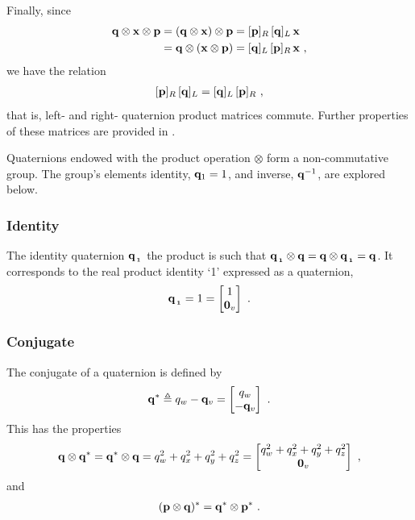 Finally, since
%
\begin{align*}
{\bf q}\otimes{\bf x}\otimes{\bf p} 
&= ({\bf q}\otimes{\bf x})\otimes{\bf p} = [{\bf p}]_R\,[{\bf q}]_L\,{\bf x} 
\\
&= {\bf q}\otimes({\bf x}\otimes{\bf p}) = [{\bf q}]_L\,[{\bf p}]_R\,{\bf x}
~,
\end{align*}
%
we have the relation
%
\begin{align}
[{\bf p}]_R\,[{\bf q}]_L = [{\bf q}]_L\,[{\bf p}]_R~,
\label{equ:PQ_commute}
\end{align}
%
that is, left- and right- quaternion product matrices commute.
Further properties of these matrices are provided in .


Quaternions endowed with the product operation $\otimes$ form a non-commutative group. 
The group's elements identity, ${\bf q}_1=1$, and inverse, ${\bf q}^{-1}$,  are explored below.

\subsubsection{Identity}

The identity quaternion ${\bf q}_{{\,}_{\bf 1}}$ \wrt the product is such that ${\bf q}_{{\,}_{\bf 1}}\otimes{\bf q}={\bf q}\otimes{\bf q}_{{\,}_{\bf 1}}={\bf q}$. 
It corresponds to the real product identity `1' expressed as a quaternion,
%
\begin{align*}
{\bf q}_{{\,}_{\bf 1}} = 1 = \begin{bmatrix}
1 \\ {\bf0}_v
\end{bmatrix} ~.
\end{align*}


\subsubsection{Conjugate}

The conjugate of a quaternion is defined by
%
\begin{align}
{\bf q}^*\triangleq q_w-{\bf q}_v=\begin{bmatrix}
q_w \\ -{\bf q}_v
\end{bmatrix}
~.
\end{align}
%
This has the properties
%
\begin{align}
{\bf q}\otimes{\bf q}^* = {\bf q}^*\otimes{\bf q} 
=q_w^2 +q_x^2 +q_y^2 +q_z^2
= \begin{bmatrix}
q_w^2 +q_x^2 +q_y^2 +q_z^2 \\ {\bf0}_v
\end{bmatrix}
~,
\end{align}
%
and
%
\begin{align}
({\bf p}\otimes{\bf q})^* = {\bf q}^*\otimes{\bf p}^* 
~.
\end{align}%


